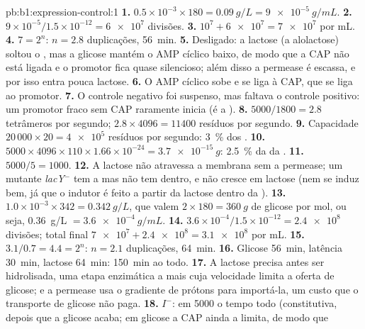 \begin{solution}{pb:b1:expression-control:1}
\textbf{1.} $0.5\times 10^{-3}\times 180 = \qty{0.09}{g/L} =
\qty{9e-5}{g/mL}$.
\textbf{2.} $9\times 10^{-5}/1.5\times 10^{-12} = \num{6e7}$ divisões.
\textbf{3.} $10^7 + \num{6e7} = \num{7e7}$  por mL.
\textbf{4.} $7 = 2^n$: $n = 2.8$ duplicações, \qty{56}{min}.
\textbf{5.} Desligado: a lactose (a alolactose) soltou o , mas
a glicose mantém o AMP cíclico baixo, de modo que a CAP não está ligada
e o promotor fica quase silencioso; além disso a permease é escassa, e
por isso entra pouca lactose.
\textbf{6.} O AMP cíclico sobe e se liga à CAP, que se liga ao promotor.
\textbf{7.} O controle negativo foi suspenso, mas faltava o controle
positivo: um promotor fraco sem CAP raramente inicia (é a ).
\textbf{8.} $5000/1800 = 2.8$ tetrâmeros por segundo; $2.8\times 4096 =
\num{11400}$ resíduos por segundo.
\textbf{9.} Capacidade $20\,000\times 20 = \num{4e5}$ resíduos por
segundo: \qty{3}{\%} dos .
\textbf{10.} $5000\times 4096\times 110\times 1.66\times 10^{-24} =
\qty{3.7e-15}{g}$: \qty{2.5}{\%} da  da .
\textbf{11.} $5000/5 = 1000$.
\textbf{12.} A lactose não atravessa a membrana sem a permease; um
mutante \emph{lacY}$^-$ tem a  mas não tem  dentro, e não
cresce em lactose (nem se induz bem, já que o indutor é feito a partir
da lactose dentro da ).
\textbf{13.} $1.0\times 10^{-3}\times 342 = \qty{0.342}{g/L}$, que valem
$2\times 180 = \qty{360}{g}$ de glicose por mol, ou seja,
\qty{0.36}{g/L} $= \qty{3.6e-4}{g/mL}$.
\textbf{14.} $3.6\times 10^{-4}/1.5\times 10^{-12} = \num{2.4e8}$
divisões; total final $\num{7e7} + \num{2.4e8} = \num{3.1e8}$ por mL.
\textbf{15.} $3.1/0.7 = 4.4 = 2^n$: $n = 2.1$ duplicações,
\qty{64}{min}.
\textbf{16.} Glicose \qty{56}{min}, latência \qty{30}{min}, lactose
\qty{64}{min}: \qty{150}{min} ao todo.
\textbf{17.} A lactose precisa antes ser hidrolisada, uma etapa
enzimática a mais cuja velocidade limita a oferta de glicose; e a
permease usa o gradiente de prótons para importá-la, um custo que o
transporte de glicose não paga.
\textbf{18.} $I^-$:  em \num{5000} o tempo todo (constitutiva,
depois que a glicose acaba; em glicose a CAP ainda a limita, de modo que

\end{solution}
